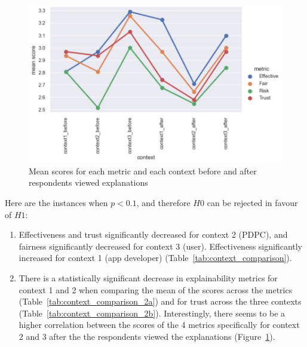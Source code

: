 \begin{figure}[!ht]
  \centering
  \includegraphics[width=1\linewidth]{figures/part2_part6_metric_comparison.png}
  \caption{Mean scores for each metric and each context before and after respondents viewed explanations}
  \label{fig:part2_part6_comparison}
\end{figure}


Here are the instances when $p<0.1$, and therefore $H0$ can be rejected in favour of $H1$:
\begin{enumerate}
    \item Effectiveness and trust significantly decreased for context 2 (PDPC), and fairness significantly decreased for context 3 (user). Effectiveness significantly increased for context 1 (app developer) (Table~\ref{tab:context_comparison}).
    \item There is a statistically significant decrease in explainability metrics for context 1 and 2 when comparing the mean of the scores across the metrics (Table~\ref{tab:context_comparison_2a}) and for trust across the three contexts (Table~\ref{tab:context_comparison_2b}). Interestingly, there seems to be a higher correlation between the scores of the 4 metrics specifically for context 2 and 3 after the the respondents viewed the explanations (Figure~\ref{fig:part2_part6_comparison}).
\end{enumerate}

